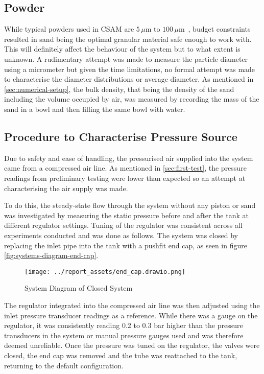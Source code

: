 \subsection{Powder}
While typical powders used in CSAM are $5\,\mu\mathrm{m}$ to $100\,\mu\mathrm{m}$~\cite{Vaz2023}, budget constraints resulted in sand being the optimal granular material safe enough to work with. This will definitely affect the behaviour of the system but to what extent is unknown. A rudimentary attempt was made to measure the particle diameter using a micrometer but given the time limitations, no formal attempt was made to characterise the diameter distributions or average diameter. As mentioned in \autoref{sec:numerical-setup}, the bulk density, that being the density of the sand including the volume occupied by air, was measured by recording the mass of the sand in a bowl and then filling the same bowl with water.



\subsection{Procedure to Characterise Pressure Source}\label{sec:pressure-source-procedure}
Due to safety and ease of handling, the pressurised air supplied into the system came from a compressed air line. As mentioned in \autoref{sec:first-test}, the pressure readings from preliminary testing were lower than expected so an attempt at characterising the air supply was made. 

To do this, the steady-state flow through the system without any piston or sand was investigated by measuring the static pressure before and after the tank at different regulator settings. Tuning of the regulator was consistent across all experiments conducted and was done as follows. The system was closed by replacing the inlet pipe into the tank with a pushfit end cap, as seen in figure \autoref{fig:systems-diagram-end-cap}.
\begin{figure}[htbp]
    \centering
    \begin{minipage}{0.60\textwidth}
        \centering
        \texttt{[image: ../report\_assets/end\_cap.drawio.png]}
        \caption{System Diagram of Closed System}\label{fig:systems-diagram-end-cap}
    \end{minipage}
\end{figure}
The regulator integrated into the compressed air line was then adjusted using the inlet pressure transducer readings as a reference. While there was a gauge on the regulator, it was consistently reading 0.2 to 0.3 bar higher than the pressure transducers in the system or manual pressure gauges used and was therefore deemed unreliable. Once the pressure was tuned on the regulator, the valves were closed, the end cap was removed and the tube was reattached to the tank, returning to the default configuration. 

